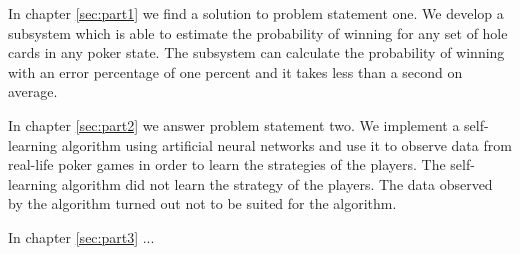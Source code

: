 In chapter \ref{sec:part1} we find a solution to problem statement one. We develop a subsystem which is able to estimate the probability of winning for any set of hole cards in any poker state. The subsystem can calculate the probability of winning with an error percentage of one percent and it takes less than a second on average.

In chapter \ref{sec:part2} we answer problem statement two. We implement a self-learning algorithm using artificial neural networks and use it to observe data from real-life poker games in order to learn the strategies of the players. The self-learning algorithm did not learn the strategy of the players. The data observed by the algorithm turned out not to be suited for the algorithm.

In chapter \ref{sec:part3} ...
